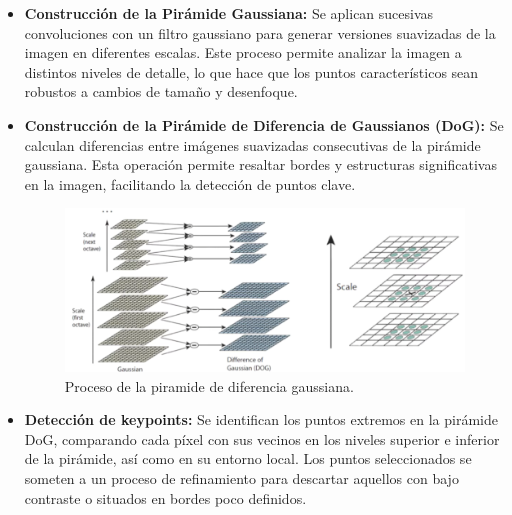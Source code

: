 \documentclass[a4paper]{article}
\begin{document}
  \begin{itemize}
      \item \textbf{Construcción de la Pirámide Gaussiana:}  
      Se aplican sucesivas convoluciones con un filtro gaussiano para generar versiones suavizadas de la imagen en diferentes escalas. Este proceso permite analizar la imagen a distintos niveles de detalle, lo que hace que los puntos característicos sean robustos a cambios de tamaño y desenfoque.
      
      \item \textbf{Construcción de la Pirámide de Diferencia de Gaussianos (DoG):}  
      Se calculan diferencias entre imágenes suavizadas consecutivas de la pirámide gaussiana. Esta operación permite resaltar bordes y estructuras significativas en la imagen, facilitando la detección de puntos clave.
      
      \begin{figure}[H]
        \centering
        \includegraphics[width=1.1\textwidth]{images/sift_gauss.png}
        \caption{Proceso de la piramide de diferencia gaussiana.}
    \end{figure}
    
      \item \textbf{Detección de keypoints:}  
      Se identifican los puntos extremos en la pirámide DoG, comparando cada píxel con sus vecinos en los niveles superior e inferior de la pirámide, así como en su entorno local. Los puntos seleccionados se someten a un proceso de refinamiento para descartar aquellos con bajo contraste o situados en bordes poco definidos.
      

\end{itemize}
\end{document}
